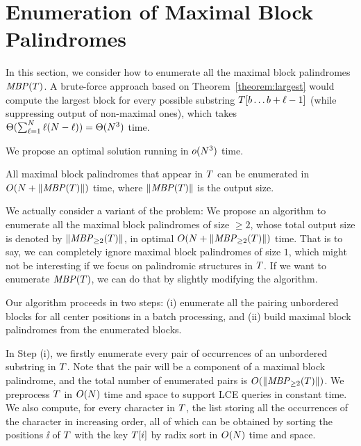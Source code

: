\section{Enumeration of Maximal Block Palindromes}
In this section, we consider how to enumerate all the maximal block palindromes $\mathit{MBP}(T)$.
A brute-force approach based on Theorem~\ref{theorem:largest} would compute the largest block for every possible substring $T[b \ldots b + \ell - 1]$
(while suppressing output of non-maximal ones), which takes $\Theta(\sum_{\ell = 1}^{N} \ell (N - \ell)) = \Theta(N^3)$ time.

We propose an optimal solution running in $o(N^3)$ time.
\begin{theorem}
  All maximal block palindromes that appear in $T$ can be enumerated in $O(N + \|\mathit{MBP}(T)\|)$ time, 
  where $\|\mathit{MBP}(T)\|$ is the output size.
\end{theorem}

We actually consider a variant of the problem:
We propose an algorithm to enumerate all the maximal block palindromes of size $\ge 2$,
whose total output size is denoted by $\|\mathit{MBP}_{\ge 2}(T)\|$, in optimal $O(N + \|\mathit{MBP}_{\ge 2}(T)\|)$ time.
That is to say, we can completely ignore maximal block palindromes of size $1$,
which might not be interesting if we focus on palindromic structures in $T$.
If we want to enumerate $\mathit{MBP}(T)$, we can do that by slightly modifying the algorithm.

Our algorithm proceeds in two steps:
(i) enumerate all the pairing unbordered blocks for all center positions in a batch processing, and
(ii) build maximal block palindromes from the enumerated blocks.

In Step (i), we firstly enumerate every pair of occurrences of an unbordered substring in $T$.
Note that the pair will be a component of a maximal block palindrome, and the total number of enumerated pairs is $O(\|\mathit{MBP}_{\ge 2}(T)\|)$.
We preprocess $T$ in $O(N)$ time and space to support LCE queries in constant time.
We also compute, for every character in $T$, the list storing all the occurrences of the character in increasing order,
all of which can be obtained by sorting the positions $\ii$ of $T$ with the key $T[i]$ by radix sort in $O(N)$ time and space.

